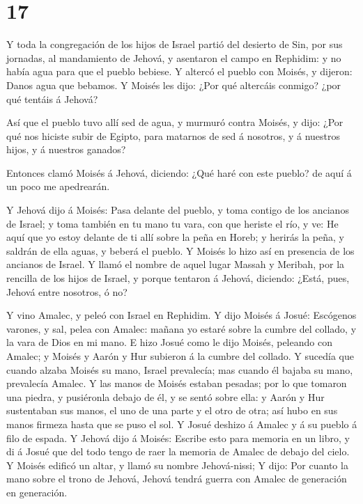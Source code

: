 \hypertarget{section-16}{%
\section{17}\label{section-16}}

 Y toda la congregación de los hijos de Israel partió del
desierto de Sin, por sus jornadas, al mandamiento de Jehová, y asentaron
el campo en Rephidim: y no había agua para que el pueblo bebiese.
 Y altercó el pueblo con Moisés, y dijeron: Danos agua que
bebamos. Y Moisés les dijo: ¿Por qué altercáis conmigo? ¿por qué tentáis
á Jehová?

 Así que el pueblo tuvo allí sed de agua, y murmuró contra
Moisés, y dijo: ¿Por qué nos hiciste subir de Egipto, para matarnos de
sed á nosotros, y á nuestros hijos, y á nuestros ganados?

 Entonces clamó Moisés á Jehová, diciendo: ¿Qué haré con
este pueblo? de aquí á un poco me apedrearán.

 Y Jehová dijo á Moisés: Pasa delante del pueblo, y toma
contigo de los ancianos de Israel; y toma también en tu mano tu vara,
con que heriste el río, y ve:  He aquí que yo estoy delante
de ti allí sobre la peña en Horeb; y herirás la peña, y saldrán de ella
aguas, y beberá el pueblo. Y Moisés lo hizo así en presencia de los
ancianos de Israel.  Y llamó el nombre de aquel lugar Massah
y Meribah, por la rencilla de los hijos de Israel, y porque tentaron á
Jehová, diciendo: ¿Está, pues, Jehová entre nosotros, ó no?

 Y vino Amalec, y peleó con Israel en Rephidim. 
Y dijo Moisés á Josué: Escógenos varones, y sal, pelea con Amalec:
mañana yo estaré sobre la cumbre del collado, y la vara de Dios en mi
mano.  E hizo Josué como le dijo Moisés, peleando con
Amalec; y Moisés y Aarón y Hur subieron á la cumbre del collado.
 Y sucedía que cuando alzaba Moisés su mano, Israel
prevalecía; mas cuando él bajaba su mano, prevalecía Amalec.
 Y las manos de Moisés estaban pesadas; por lo que tomaron
una piedra, y pusiéronla debajo de él, y se sentó sobre ella: y Aarón y
Hur sustentaban sus manos, el uno de una parte y el otro de otra; así
hubo en sus manos firmeza hasta que se puso el sol.  Y
Josué deshizo á Amalec y á su pueblo á filo de espada.  Y
Jehová dijo á Moisés: Escribe esto para memoria en un libro, y di á
Josué que del todo tengo de raer la memoria de Amalec de debajo del
cielo.  Y Moisés edificó un altar, y llamó su nombre
Jehová-nissi;  Y dijo: Por cuanto la mano sobre el trono de
Jehová, Jehová tendrá guerra con Amalec de generación en generación.

